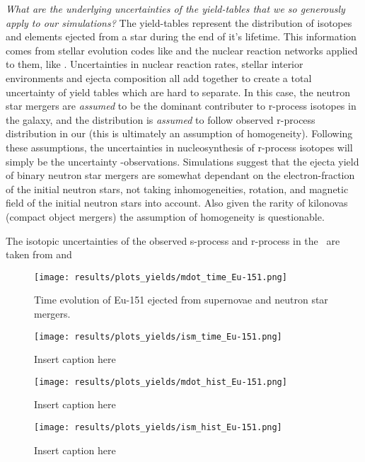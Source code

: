\textit{What are the underlying uncertainties of the yield-tables that we so generously apply to our simulations?}
The yield-tables represent the distribution of isotopes and elements ejected from a star during the end of it's lifetime. This information comes from stellar evolution codes like \cite{paxton11} and the nuclear reaction networks applied to them, like \cite{pignatari16}.
Uncertainties in nuclear reaction rates, stellar interior environments and ejecta composition all add together to create a total uncertainty of yield tables which are hard to separate.
In this case, the neutron star mergers are \textit{assumed} to be the dominant contributer to r-process isotopes in the galaxy, and the distribution is \textit{assumed} to follow observed r-process distribution in our \sos (this is ultimately an assumption of homogeneity).
Following these assumptions, the uncertainties in nucleosynthesis of r-process isotopes will simply be the uncertainty \sos-observations\cite{arnould07}.
Simulations suggest that the ejecta yield of binary neutron star mergers are somewhat dependant on the electron-fraction of the initial neutron stars, not taking inhomogeneities, rotation, and magnetic field of the initial neutron stars into account. Also given the rarity of kilonovas (compact object mergers) the assumption of homogeneity is questionable.



The isotopic uncertainties of the observed s-process and r-process in the \sos\ are taken from \cite{arnould07} and \cite{landolt93}

\begin{figure}
  \centering
  \texttt{[image: results/plots\_yields/mdot\_time\_Eu-151.png]}
  \caption{Time evolution of Eu-151 ejected from supernovae and neutron star mergers.}
\end{figure}
\begin{figure}
  \centering
  \texttt{[image: results/plots\_yields/ism\_time\_Eu-151.png]}
  \caption{Insert caption here}
\end{figure}
\begin{figure}
  \centering
  \texttt{[image: results/plots\_yields/mdot\_hist\_Eu-151.png]}
  \caption{Insert caption here}
\end{figure}
\begin{figure}
  \centering
  \texttt{[image: results/plots\_yields/ism\_hist\_Eu-151.png]}
  \caption{Insert caption here}
\end{figure}


